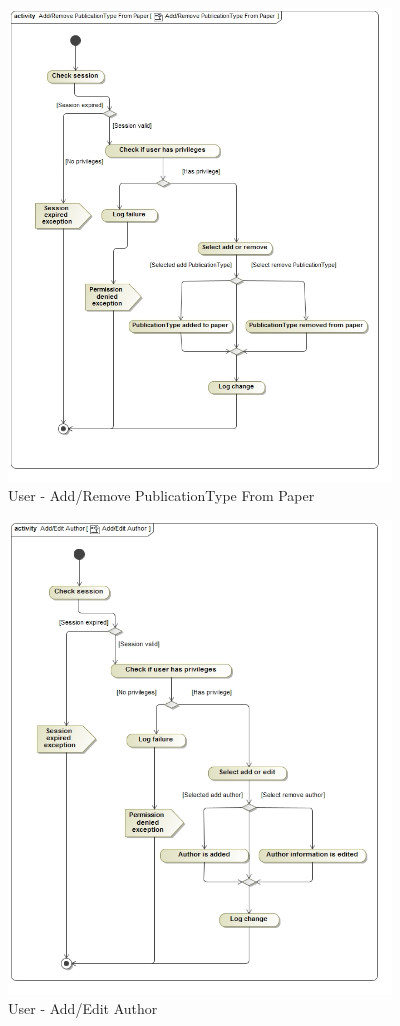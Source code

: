 \documentclass{article}
\begin{document}
			\begin{figure}[H]
				\includegraphics[width=4in, center]{../Diagrams/Process Specifications/Publication subsystem/Add_Remove PublicationType From Paper.jpg}
				\caption{User - Add/Remove PublicationType From Paper}
			\end{figure}
			\begin{figure}[H]
				\includegraphics[width=4in, center]{../Diagrams/Process Specifications/Publication subsystem/Add_Edit Author.jpg}
				\caption{User - Add/Edit Author}
			\end{figure}
\end{document}
